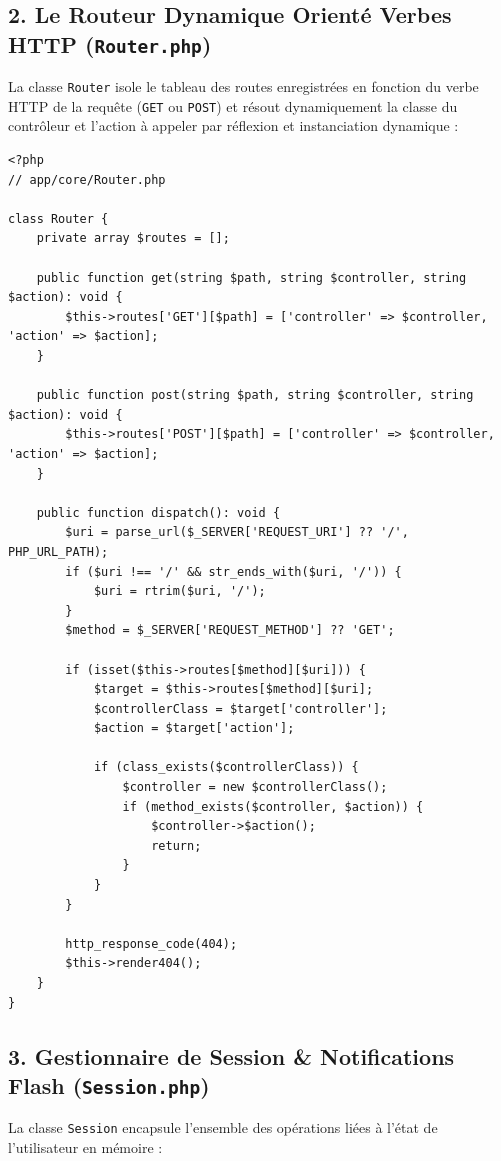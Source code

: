 \documentclass[11pt,a4paper,oneside]{report}
\begin{document}
\subsection{2. Le Routeur Dynamique Orienté Verbes HTTP (\texttt{Router.php})}
La classe \texttt{Router} isole le tableau des routes enregistrées en fonction du verbe HTTP de la requête (\texttt{GET} ou \texttt{POST}) et résout dynamiquement la classe du contrôleur et l'action à appeler par réflexion et instanciation dynamique :

\begin{lstlisting}[language=PHP8, caption={La classe Router et son algorithme de dispatching}]
<?php
// app/core/Router.php

class Router {
    private array $routes = [];

    public function get(string $path, string $controller, string $action): void {
        $this->routes['GET'][$path] = ['controller' => $controller, 'action' => $action];
    }

    public function post(string $path, string $controller, string $action): void {
        $this->routes['POST'][$path] = ['controller' => $controller, 'action' => $action];
    }

    public function dispatch(): void {
        $uri = parse_url($_SERVER['REQUEST_URI'] ?? '/', PHP_URL_PATH);
        if ($uri !== '/' && str_ends_with($uri, '/')) {
            $uri = rtrim($uri, '/');
        }
        $method = $_SERVER['REQUEST_METHOD'] ?? 'GET';

        if (isset($this->routes[$method][$uri])) {
            $target = $this->routes[$method][$uri];
            $controllerClass = $target['controller'];
            $action = $target['action'];

            if (class_exists($controllerClass)) {
                $controller = new $controllerClass();
                if (method_exists($controller, $action)) {
                    $controller->$action();
                    return;
                }
            }
        }

        http_response_code(404);
        $this->render404();
    }
}
\end{lstlisting}

\subsection{3. Gestionnaire de Session \& Notifications Flash (\texttt{Session.php})}
La classe \texttt{Session} encapsule l'ensemble des opérations liées à l'état de l'utilisateur en mémoire :
\end{document}

